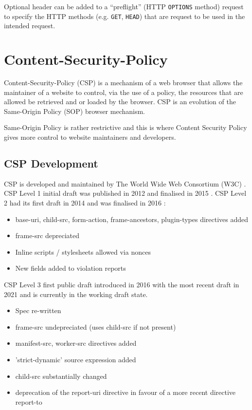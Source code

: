 \documentclass{mscreport}
\begin{document}
Optional header can be added to a ``preflight'' (HTTP \texttt{OPTIONS} method) request to specify the HTTP methods (e.g. \texttt{GET}, \texttt{HEAD}) that are request to be used in the intended request.

\newpage

\section{Content-Security-Policy}
\label{section:csp}

Content-Security-Policy (CSP) is a mechanism of a web browser that allows the maintainer of a website to control, via the use of a policy, the resources that are allowed be retrieved and or loaded by the browser. CSP is an evolution of the Same-Origin Policy (SOP) browser mechanism.

\vspace{0.3cm}
\noindent
Same-Origin Policy is rather restrictive and this is where Content Security Policy gives more control to website maintainers and developers.

\subsection{CSP Development}

CSP is developed and maintained by The World Wide Web Consortium (W3C) \cite{Barth2012-ow}.
CSP Level 1 initial draft was published in 2012 \cite{Barth2012-ow} and finalised in 2015 \cite{Barth2015-ez}.
CSP Level 2 had its first draft in 2014 \cite{West2014-oe} and was finalised in 2016 \cite{West2016-ol}:
\begin{itemize}
	\setlength\itemsep{0.1em}
	\item base-uri, child-src, form-action, frame-ancestors, plugin-types directives added
	\item frame-src depreciated
	\item Inline scripts / stylesheets allowed via nonces
	\item New fields added to violation reports
\end{itemize}

CSP Level 3 first public draft introduced in 2016 \cite{West2016-xj} with the most recent draft in 2021 \cite{West2021-hi} and is currently in the working draft state.
\begin{itemize}
	\setlength\itemsep{0.1em}
	\item Spec re-written
	\item frame-src undepreciated (uses child-src if not present)
	\item manifest-src, worker-src directives added
	\item 'strict-dynamic' source expression added
	\item child-src substantially changed
	\item deprecation of the report-uri directive in favour of a more recent directive report-to
\end{itemize}
\end{document}
